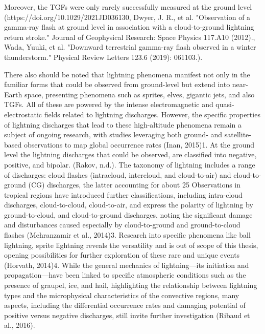 Moreover, the TGFs were only rarely successfully measured at the ground level (https://doi.org/10.1029/2021JD036130, Dwyer, J. R., et al. "Observation of a gamma‐ray flash at ground level in association with a cloud‐to‐ground lightning return stroke." Journal of Geophysical Research: Space Physics 117.A10 (2012)., Wada, Yuuki, et al. "Downward terrestrial gamma-ray flash observed in a winter thunderstorm." Physical Review Letters 123.6 (2019): 061103.).

There also should be noted that lightning phenomena manifest not only in the familiar forms that could be observed from ground-level but extend into near-Earth space, presenting phenomena such as sprites, elves, gigantic jets, and also TGFs. All of these are powered by the intense electromagnetic and quasi-electrostatic fields related to lightning discharges. However, the specific properties of lightning discharges that lead to these high-altitude phenomena remain a subject of ongoing research, with studies leveraging both ground- and satellite-based observations to map global occurrence rates (Inan, 2015)1.
At the ground level the lightning discharges that could be observed, are classified into negative, positive, and bipolar. (Rakov, n.d.). The taxonomy of lightning includes a range of discharges: cloud flashes (intracloud, intercloud, and cloud-to-air) and cloud-to-ground (CG) discharges, the latter accounting for about 25%
Observations in tropical regions have introduced further classifications, including intra-cloud discharges, cloud-to-cloud, cloud-to-air, and express the polarity of lightning by ground-to-cloud, and cloud-to-ground discharges, noting the significant damage and disturbances caused especially by cloud-to-ground and ground-to-cloud flashes (Mehranzamir et al., 2014)3.
Research into specific phenomena like ball lightning, sprite lightning reveals the versatility and is out of scope of this thesis, opening possibilities for further exploration of these rare and unique events (Horvath, 2014)4.
While the general mechanics of lightning—its initiation and propagation—have been linked to specific atmospheric conditions such as the presence of graupel, ice, and hail, highlighting the relationship between lightning types and the microphysical characteristics of the convective regions, many aspects, including the differential occurrence rates and damaging potential of positive versus negative discharges, still invite further investigation (Ribaud et al., 2016).



